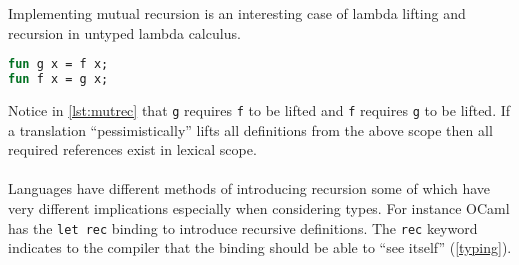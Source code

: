Implementing mutual recursion is an interesting case of lambda lifting and recursion in untyped lambda calculus.
\begin{lstlisting}[language=ML,caption={Mutual recursion},label={lst:mutrec}]
fun g x = f x;
fun f x = g x;
\end{lstlisting}
Notice in \autoref{lst:mutrec} that \texttt{g} requires \texttt{f} to be lifted and \texttt{f} requires \texttt{g} to be lifted.
If a translation ``pessimistically'' lifts all definitions from the above scope then all required references exist in lexical scope.
\\\\
Languages have different methods of introducing recursion some of which have very different implications especially when considering types.
For instance OCaml has the \texttt{let rec} binding to introduce recursive definitions.
The \texttt{rec} keyword indicates to the compiler that the binding should be able to ``see itself'' (\autoref{typing}).


